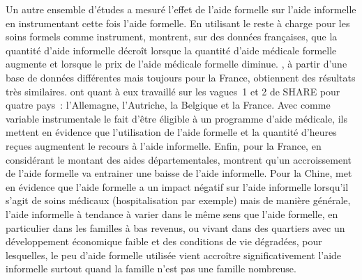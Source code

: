 \begin{Article}
\begin{refsection}[Bonnal]
Un autre ensemble d’études a mesuré l’effet de l’aide formelle sur l’aide informelle en instrumentant cette fois l’aide formelle. En utilisant le reste à charge pour les soins formels comme instrument, \textcite{ARNAULT2017} montrent, sur des données françaises, que la quantité d’aide informelle décroît lorsque la quantité d’aide médicale formelle augmente et lorsque le prix de l’aide médicale formelle diminue. \textcite{ROQUEBERT2017}, à partir d’une base de données différentes mais toujours pour la France, obtiennent des résultats très similaires. \textcite{CARRINO2018} ont quant à eux travaillé sur les vagues~1 et 2 de SHARE pour quatre pays~: l’Allemagne, l’Autriche, la Belgique et la France. Avec comme variable instrumentale le fait d’être éligible à un programme d’aide médicale, ils mettent en évidence que l’utilisation de l'aide formelle et la quantité d’heures reçues augmentent le recours à l'aide informelle. Enfin, pour la France, en considérant le montant des aides départementales, \textcite{PERDRIX2021} montrent qu’un accroissement de l’aide formelle va entrainer une baisse de l’aide informelle. Pour la Chine, \textcite{LIU2021} met en évidence que l’aide formelle a un impact négatif sur l’aide informelle lorsqu’il s’agit de soins médicaux (hospitalisation par exemple) mais de manière générale, l’aide informelle à tendance à varier dans le même sens que l’aide formelle, en particulier dans les familles à bas revenus, ou vivant dans des quartiers avec un développement économique faible et des conditions de vie dégradées, pour lesquelles, le peu d’aide formelle utilisée vient accroître significativement l’aide informelle surtout quand la famille n'est pas une famille nombreuse.


\end{refsection}
\end{Article}
